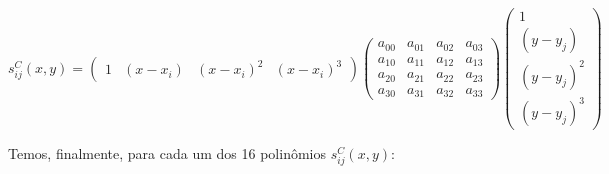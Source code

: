 \documentclass[11pt]{article}
\begin{document}
  \begin{center}
    $ s_{ij}^C(x, y) = \begin{pmatrix}
      1 & (x - x_i) & (x - x_i)^2 & (x - x_i)^3
    \end{pmatrix}
    \begin{pmatrix}
      a_{00}  & a_{01} & a_{02} & a_{03} \\
      a_{10}  & a_{11} & a_{12} & a_{13} \\
      a_{20}  & a_{21} & a_{22} & a_{23} \\
      a_{30}  & a_{31} & a_{32} & a_{33}
    \end{pmatrix}
    \begin{pmatrix}
      1  \\
      (y - y_j) \\
      (y - y_j)^2  \\
      (y - y_j)^3
    \end{pmatrix}$
  \end{center}

  Temos, finalmente, para cada um dos 16 polinômios $s_{ij}^C(x, y)$:
\end{document}

